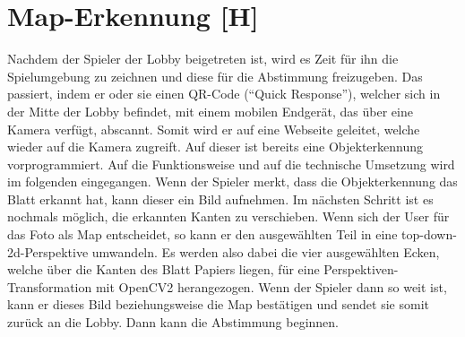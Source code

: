 
\newpage
\section{Map-Erkennung [H]}\label{maai:maperkennung:head}
Nachdem der Spieler der Lobby beigetreten ist, wird es Zeit für ihn die Spielumgebung zu zeichnen und diese für die
Abstimmung freizugeben. Das passiert, indem er oder sie einen QR-Code (``Quick Response''), welcher sich in der
Mitte der Lobby befindet, mit einem mobilen Endgerät, das über eine Kamera verfügt, abscannt. Somit wird
er auf eine Webseite geleitet, welche wieder auf die Kamera zugreift. Auf dieser ist bereits eine Objekterkennung
vorprogrammiert. Auf die Funktionsweise und auf die technische Umsetzung wird im folgenden eingegangen. Wenn der Spieler
merkt, dass die Objekterkennung das Blatt erkannt hat, kann dieser ein Bild aufnehmen. Im nächsten Schritt ist es nochmals möglich,
die erkannten Kanten zu verschieben. Wenn sich der User für das Foto als Map entscheidet, so kann er den ausgewählten Teil in eine
top-down-2d-Perspektive
umwandeln. Es werden also dabei die vier ausgewählten Ecken, welche über die Kanten des Blatt Papiers liegen,
für eine Perspektiven-Transformation
mit OpenCV2 herangezogen. Wenn der Spieler dann so weit ist, kann er dieses Bild beziehungsweise die Map bestätigen und
sendet sie somit zurück an die Lobby. Dann kann die Abstimmung beginnen.


